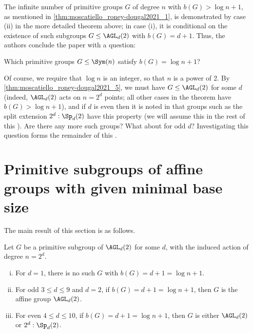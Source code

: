 The infinite number of primitive groups $G$ of degree $n$ with $b(G) > \log n + 1$, as mentioned in \autoref{thm:moscatiello_roney-dougal2021_1}, is demonstrated by case (ii) in the more detailed theorem above; in case (i), it is conditional on the existence of such subgroups $G \leq \AGL_d(2)$ with $b(G) = d + 1$. Thus, the authors conclude the paper \cite{moscatiello_roney-dougal2021} with a question:

\begin{question}\label{qn:moscatiello_roney-dougal2021}
    Which primitive groups $G \leq \Sym(n)$ satisfy $b(G) = \log n + 1$?
\end{question}

Of course, we require that $\log n$ is an integer, so that $n$ is a power of 2. By \autoref{thm:moscatiello_roney-dougal2021_5}, we must have $G \leq \AGL_d(2)$ for some $d$ (indeed, $\AGL_d(2)$ acts on $n = 2^d$ points; all other cases in the theorem have $b(G) > \log n + 1$), and if $d$ is even then it is noted in \cite{moscatiello_roney-dougal2021} that groups such as the split extension $2^d : \Sp_d(2)$ have this property (we will assume this in the rest of this \thesis{}). Are there any more such groups? What about for odd $d$? Investigating this question forms the remainder of this \thesis{}.

\section{Primitive subgroups of affine groups with given minimal base size}

The main result of this section is as follows.

\begin{theorem}\label{thm:new_result}
    Let $G$ be a primitive subgroup of $\AGL_d(2)$ for some $d$, with the induced action of degree $n = 2^d$.
    \begin{enumerate}[(i)]
        \item For $d = 1$, there is no such $G$ with $b(G) = d + 1 = \log n + 1$.
        \item For odd $3 \leq d \leq 9$ and $d = 2$, if $b(G) = d + 1 = \log n + 1$, then $G$ is the affine group $\AGL_d(2)$.
        \item For even $4 \leq d \leq 10$, if $b(G) = d + 1 = \log n + 1$, then $G$ is either $\AGL_d(2)$ or $2^d : \Sp_d(2)$.
    \end{enumerate}
\end{theorem}

